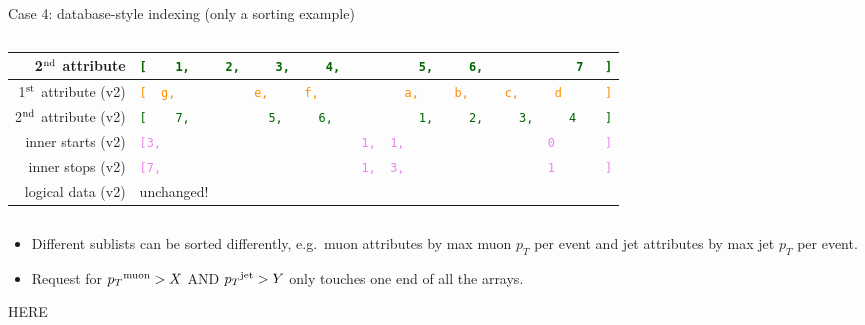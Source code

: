 \documentclass[aspectratio=169]{beamer}
\begin{document}
\begin{frame}{Case 4: database-style indexing (only a sorting example)}
\begin{columns}
\begin{tabular}{r l}
\small 2$^{\mbox{\scriptsize nd}}$ attribute & {\tt\scriptsize \textcolor{darkgreen}{[\ \ \ \ 1,\ \ \ \ \ 2,\ \ \ \ \ 3,\ \ \ \ \ 4,\ \ \ \ \ \ \ \ \ \ \ 5,\ \ \ \ \ 6,\ \ \ \ \ \ \ \ \ \ \ \ \ 7\ \ \ ]}} \\\hline
\small 1$^{\mbox{\scriptsize st}}$ attribute (v2) & {\tt\scriptsize \textcolor{darkorange}{[\ \ g,\ \ \ \ \ \ \ \ \ \ \ e,\ \ \ \ \ f,\ \ \ \ \ \ \ \ \ \ \ \ a,\ \ \ \ \ b,\ \ \ \ \ c,\ \ \ \ \ d\ \ \ \ \ \ ]}} \\
\small 2$^{\mbox{\scriptsize nd}}$ attribute (v2) & {\tt\scriptsize \textcolor{darkgreen}{[\ \ \ \ 7,\ \ \ \ \ \ \ \ \ \ \ 5,\ \ \ \ \ 6,\ \ \ \ \ \ \ \ \ \ \ \ 1,\ \ \ \ \ 2,\ \ \ \ \ 3,\ \ \ \ \ 4\ \ \ \ ]}} \\
\small inner starts (v2) & {\tt\scriptsize \textcolor{violet}{[3,\ \ \ \ \ \ \ \ \ \ \ \ \ \ \ \ \ \ \ \ \ \ \ \ \ \ \ \ 1,\ \ 1,\ \ \ \ \ \ \ \ \ \ \ \ \ \ \ \ \ \ \ \ 0\ \ \ \ \ \ \ ]}} \\
\small inner stops (v2)  & {\tt\scriptsize \textcolor{violet}{[7,\ \ \ \ \ \ \ \ \ \ \ \ \ \ \ \ \ \ \ \ \ \ \ \ \ \ \ \ 1,\ \ 3,\ \ \ \ \ \ \ \ \ \ \ \ \ \ \ \ \ \ \ \ 1\ \ \ \ \ \ \ ]}} \\\hline
\small logical data (v2) & unchanged! \\
\end{tabular}
\end{columns}

\vspace{0.25 cm}
\begin{itemize}
\item<2-> Different sublists can be sorted differently, e.g.\ muon attributes by max muon $p_T$ per event and jet attributes by max jet $p_T$ per event.
\item<3-> Request for ${p_T}^{\mbox{\scriptsize muon}} > X$ AND ${p_T}^{\mbox{\scriptsize jet}} > Y$ only touches one end of all the arrays.
\end{itemize}
\end{frame}

\begin{frame}{}
HERE
\end{frame}
\end{document}
